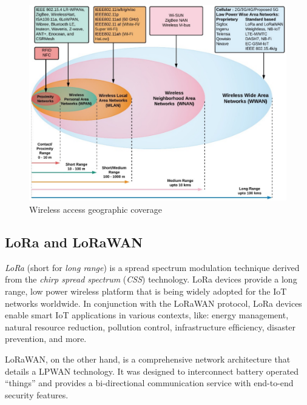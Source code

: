 		\begin{figure}
			\centering
			\includegraphics[width=\textheight,height=\textwidth,keepaspectratio,angle=90]{resources/img/chap3/iot_range}
			\caption[Wireless access geographic coverage]{Wireless access geographic coverage \cite{fi12030046}}
			\label{img:wireless_coverage}
		\end{figure}
	
		\subsection{LoRa and LoRaWAN}\label{subsec:lora_lorawan}
	
			\textit{LoRa} (short for \textit{long range}) is a spread spectrum modulation technique derived from the \textit{chirp spread spectrum} (\textit{CSS}) technology.
			LoRa devices provide a long range, low power wireless platform that is being widely adopted for the IoT networks worldwide.
			In conjunction with the LoRaWAN protocol, LoRa devices enable smart IoT applications in various contexts, like: energy management, natural resource reduction, pollution control, infrastructure efﬁciency, disaster prevention, and more. 
	
			LoRaWAN, on the other hand, is a comprehensive network architecture that details a LPWAN technology.
			It was designed to interconnect battery operated ``things'' and provides a bi-directional communication service with end-to-end security features.
	
